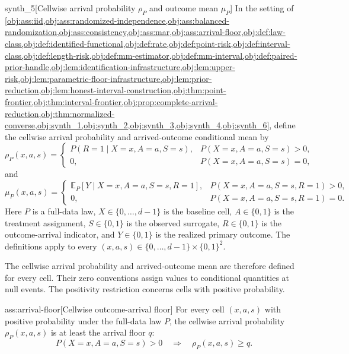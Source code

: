 \documentclass[11pt]{article}
\begin{document}
\begin{definitionv}{synth_5}[Cellwise arrival probability $\rho_P$ and outcome mean $\mu_P$]
In the setting of \cref{obj:ass:iid,obj:ass:randomized-independence,obj:ass:balanced-randomization,obj:ass:consistency,obj:ass:mar,obj:ass:arrival-floor,obj:def:law-class,obj:def:identified-functional,obj:def:rate,obj:def:point-risk,obj:def:interval-class,obj:def:length-risk,obj:def:mm-estimator,obj:def:mm-interval,obj:def:paired-prior-handle,obj:lem:identification-infrastructure,obj:lem:upper-risk,obj:lem:parametric-floor-infrastructure,obj:lem:prior-reduction,obj:lem:honest-interval-construction,obj:thm:point-frontier,obj:thm:interval-frontier,obj:prop:complete-arrival-reduction,obj:thm:normalized-converse,obj:synth_1,obj:synth_2,obj:synth_3,obj:synth_4,obj:synth_6}, define the cellwise arrival probability and arrived-outcome conditional mean by
\[
\rho_P(x,a,s)=
\begin{cases}
P(R=1\mid X=x,A=a,S=s),
& P(X=x,A=a,S=s)>0,\\
0,
& P(X=x,A=a,S=s)=0,
\end{cases}
\]
and
\[
\mu_P(x,a,s)=
\begin{cases}
\mathbb E_P[Y\mid X=x,A=a,S=s,R=1],
& P(X=x,A=a,S=s,R=1)>0,\\
0,
& P(X=x,A=a,S=s,R=1)=0.
\end{cases}
\]
Here \(P\) is a full-data law, \(X\in\{0,\ldots,d-1\}\) is the baseline cell, \(A\in\{0,1\}\) is the treatment assignment, \(S\in\{0,1\}\) is the observed surrogate, \(R\in\{0,1\}\) is the outcome-arrival indicator, and \(Y\in\{0,1\}\) is the realized primary outcome. The definitions apply to every \((x,a,s)\in\{0,\ldots,d-1\}\times\{0,1\}^2\).
\end{definitionv}

The cellwise arrival probability  and arrived-outcome mean  are therefore defined for every cell. Their zero conventions assign values to conditional quantities at null events. The positivity restriction concerns cells with positive probability.

\begin{assumptionv}{ass:arrival-floor}[Cellwise outcome-arrival floor]
For every cell \((x,a,s)\) with positive probability under the full-data law \(P\), the cellwise arrival probability \(\rho_P(x,a,s)\) is at least the arrival floor \(q\):
\[
P(X=x,A=a,S=s)>0
\quad\Longrightarrow\quad
\rho_P(x,a,s)\ge q.
\]
\end{assumptionv}
\end{document}
